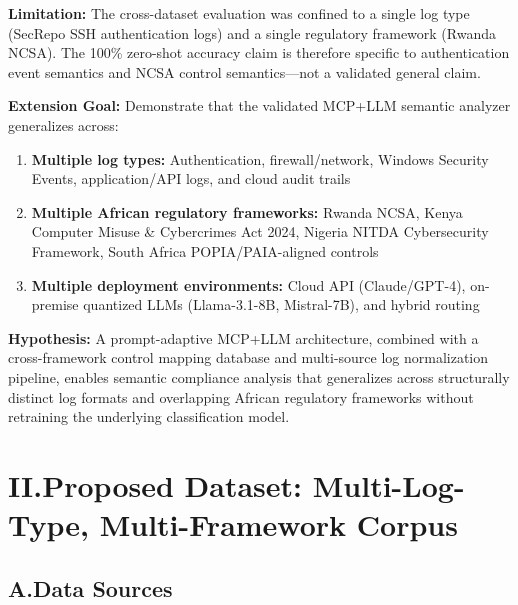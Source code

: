 \documentclass[12pt]{article}
\begin{document}
\textbf{Limitation:} The cross-dataset evaluation was confined to a single log type (SecRepo SSH authentication logs) and a single regulatory framework (Rwanda NCSA). The 100\% zero-shot accuracy claim is therefore specific to authentication event semantics and NCSA control semantics---not a validated general claim.

\textbf{Extension Goal:} Demonstrate that the validated MCP+LLM semantic analyzer generalizes across:

\begin{enumerate}
    \item \textbf{Multiple log types:} Authentication, firewall/network, Windows Security Events, application/API logs, and cloud audit trails
    \item \textbf{Multiple African regulatory frameworks:} Rwanda NCSA, Kenya Computer Misuse \& Cybercrimes Act 2024, Nigeria NITDA Cybersecurity Framework, South Africa POPIA/PAIA-aligned controls
    \item \textbf{Multiple deployment environments:} Cloud API (Claude/GPT-4), on-premise quantized LLMs (Llama-3.1-8B, Mistral-7B), and hybrid routing
\end{enumerate}

\textbf{Hypothesis:} A prompt-adaptive MCP+LLM architecture, combined with a cross-framework control mapping database and multi-source log normalization pipeline, enables semantic compliance analysis that generalizes across structurally distinct log formats and overlapping African regulatory frameworks without retraining the underlying classification model.

\bigskip

\section*{II.\quad Proposed Dataset: Multi-Log-Type, Multi-Framework Corpus}

\subsection*{A.\quad Data Sources}
\end{document}
